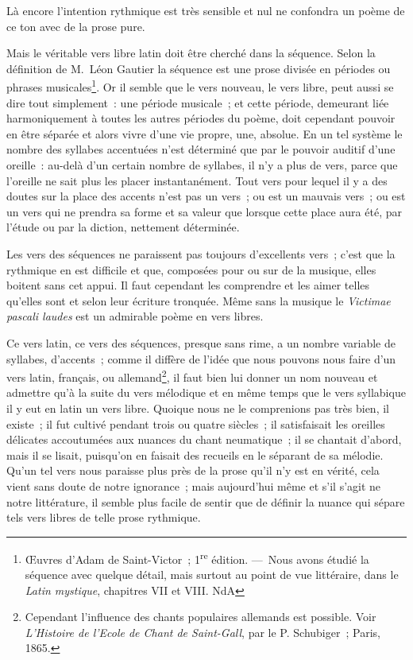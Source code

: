 \documentclass[french,twoside]{book} %
\begin{document}
\noindent Là encore l’intention rythmique est très sensible et nul ne confondra un poème de ce ton avec de la prose pure.\par
Mais le véritable vers libre latin doit être cherché dans la séquence. Selon la définition de M. Léon Gautier la séquence est une prose divisée en périodes ou phrases musicales\footnote{Œuvres d’Adam de Saint-Victor ; 1\textsuperscript{re} édition. — Nous avons étudié la séquence avec quelque détail, mais surtout au point de vue littéraire, dans le {\itshape Latin mystique}, chapitres VII et VIII. NdA}. Or il semble que le vers nouveau, le vers libre, peut aussi se dire tout simplement : une période musicale ; et cette période, demeurant liée harmoniquement à toutes les autres périodes du poème, doit cependant pouvoir en être séparée et alors vivre d’une vie propre, une, absolue. En un tel système le nombre des syllabes accentuées n’est déterminé que par le pouvoir auditif d’une oreille : au-delà d’un certain nombre de syllabes, il n’y a plus de vers, parce que l’oreille ne sait plus les placer instantanément. Tout vers pour lequel il y a des doutes sur la place des accents n’est pas un vers ; ou est un mauvais vers ; ou est un vers qui ne prendra sa forme et sa valeur que lorsque cette place aura été, par l’étude ou par la diction, nettement déterminée.\par
Les vers des séquences ne paraissent pas toujours d’excellents vers ; c’est que la rythmique en est difficile et que, composées pour ou sur de la musique, elles boitent sans cet appui. Il faut cependant les comprendre et les aimer telles qu’elles sont et selon leur écriture tronquée. Même sans la musique le {\itshape Victimae pascali laudes} est un admirable poème en vers libres.\par
Ce vers latin, ce vers des séquences, presque sans rime, a un nombre variable de syllabes, d’accents ; comme il diffère de l’idée que nous pouvons nous faire d’un vers latin, français, ou allemand\footnote{Cependant l’influence des chants populaires allemands est possible. Voir {\itshape L’Histoire de l’Ecole de Chant de Saint-Gall}, par le P. Schubiger ; Paris, 1865.}, il faut bien lui donner un nom nouveau et admettre qu’à la suite du vers mélodique et en même temps que le vers syllabique il y eut en latin un vers libre. Quoique nous ne le comprenions pas très bien, il existe ; il fut cultivé pendant trois ou quatre siècles ; il satisfaisait les oreilles délicates accoutumées aux nuances du chant neumatique ; il se chantait d’abord, mais il se lisait, puisqu’on en faisait des recueils en le séparant de sa mélodie. Qu’un tel vers nous paraisse plus près de la prose qu’il n’y est en vérité, cela vient sans doute de notre ignorance ; mais aujourd’hui même et s’il s’agit ne notre littérature, il semble plus facile de sentir que de définir la nuance qui sépare tels vers libres de telle prose rythmique.\par
\end{document}
